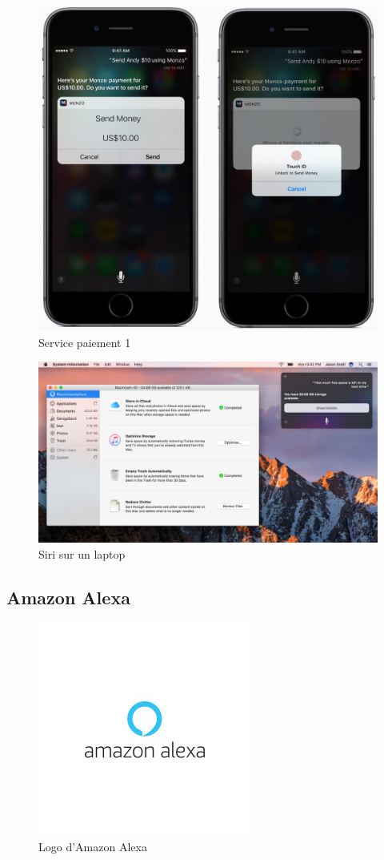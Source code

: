 \begin{figure}[H]
	\centering
	\includegraphics[width=0.5\linewidth]{images/apple_siri/cashconfirm.jpg} 
	\caption{Service paiement 1 \cite{siriDemo}}
	\label{cashconfirm}
\end{figure}

\begin{figure}[H]
	\centering
	\label{macbooksiri}
	\includegraphics[width=0.75\linewidth]{images/apple_siri/macbook.png} 
	\caption{Siri sur un laptop  \cite{macossiridemo}}
\end{figure}


\subsection*{Amazon Alexa}\label{alexa}
\begin{figure}[H]
	\centering
	\includegraphics[width=.5\linewidth]{images/amazon_alexa/logo.png}
	\caption{Logo d'Amazon Alexa} 
\end{figure}
